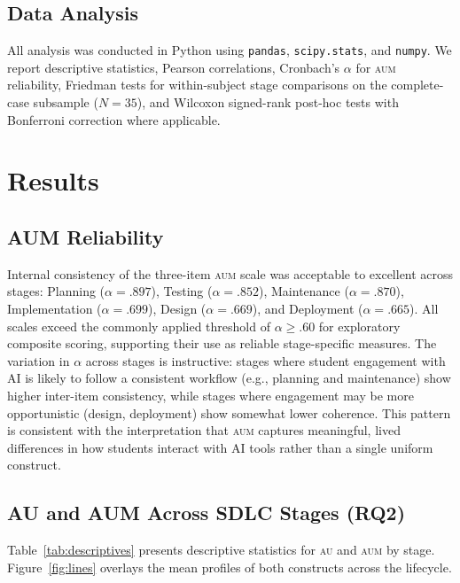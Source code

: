 \documentclass[sigconf,anonymous]{acmart}
\newcommand{\AUM}{\textsc{aum}\xspace}
\newcommand{\AU}{\textsc{au}\xspace}
\begin{document}
\subsection{Data Analysis}
All analysis was conducted in Python using \texttt{pandas},
\texttt{scipy.stats}, and \texttt{numpy}. We report descriptive
statistics, Pearson correlations, Cronbach's $\alpha$ for \AUM
reliability, Friedman tests for within-subject stage comparisons on the
complete-case subsample ($N = 35$), and Wilcoxon signed-rank post-hoc
tests with Bonferroni correction where applicable.

\section{Results}
\label{sec:results}

\subsection{AUM Reliability}
Internal consistency of the three-item \AUM scale was acceptable to
excellent across stages: Planning ($\alpha = .897$), Testing
($\alpha = .852$), Maintenance ($\alpha = .870$),
Implementation ($\alpha = .699$), Design ($\alpha = .669$), and
Deployment ($\alpha = .665$). All scales exceed the commonly applied
threshold of $\alpha \geq .60$ for exploratory composite scoring,
supporting their use as reliable stage-specific measures.
The variation in $\alpha$ across stages is instructive: stages where
student engagement with AI is likely to follow a consistent workflow
(e.g., planning and maintenance) show higher inter-item consistency,
while stages where engagement may be more opportunistic (design,
deployment) show somewhat lower coherence. This pattern is consistent
with the interpretation that \AUM captures meaningful, lived
differences in how students interact with AI tools rather than a
single uniform construct.

\subsection{AU and AUM Across SDLC Stages (RQ2)}
Table~\ref{tab:descriptives} presents descriptive statistics for \AU and
\AUM by stage. Figure~\ref{fig:lines} overlays the mean profiles of both
constructs across the lifecycle.
\end{document}
